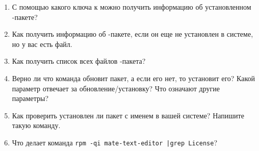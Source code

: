 \begin{enumerate}
	\item С помощью какого ключа к  можно получить информацию об установленном -пакете?
	\item Как получить информацию об -пакете, если он еще не установлен в системе, но у вас есть файл.
	\item Как получить список всех файлов -пакета?
	\item Верно ли что команда  обновит пакет, а если его нет, то установит его?
		Какой параметр отвечает за обновление/установку? Что означают другие параметры?
	\item Как проверить установлен ли пакет с именем  в вашей системе? Напишите такую команду.
	\item Что делает команда \verb!rpm -qi mate-text-editor |grep License!?
\end{enumerate}
